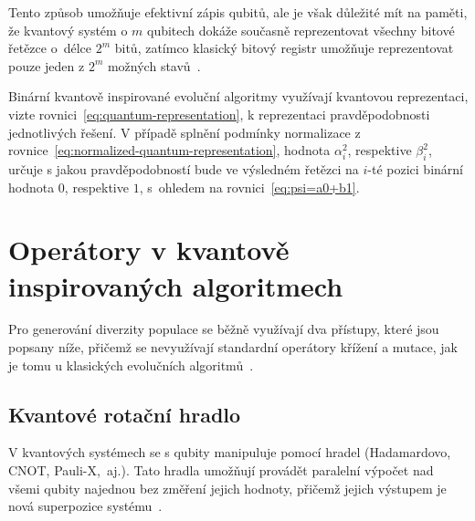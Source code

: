 Tento způsob umožňuje efektivní zápis qubitů, ale je však důležité mít na paměti, že kvantový systém o $m$ qubitech dokáže současně reprezentovat všechny bitové řetězce o~délce $2^m$ bitů, zatímco klasický bitový registr umožňuje reprezentovat pouze jeden z $2^m$ možných stavů~\cite{NaturalComputing}. 

Binární kvantově inspirované evoluční algoritmy využívají kvantovou reprezentaci, vizte rovnici~\ref{eq:quantum-representation}, k reprezentaci pravděpodobnosti jednotlivých řešení. 
V případě splnění podmínky normalizace z rovnice~\ref{eq:normalized-quantum-representation}, hodnota $\alpha^2_i$, respektive $\beta^2_i$, určuje s jakou pravděpodobností bude ve výsledném řetězci na $i$-té pozici binární hodnota $0$, respektive $1$, s~ohledem na rovnici~\ref{eq:psi=a0+b1}.

\section{Operátory v kvantově inspirovaných algoritmech}
Pro generování diverzity populace se běžně využívají dva přístupy, které jsou popsany níže, přičemž se nevyužívají standardní operátory křížení a mutace, jak je tomu u klasických evolučních algoritmů~\cite{NaturalComputing}.

\subsection{Kvantové rotační hradlo}\label{subsec:quantum-gates}
V kvantových systémech se s qubity manipuluje pomocí hradel (Hadamardovo, CNOT, Pauli-X,~aj.). 
Tato hradla umožňují provádět paralelní výpočet nad všemi qubity najednou bez změření jejich hodnoty, přičemž jejich výstupem je nová superpozice systému~\cite{NaturalComputing,QuantumComputing-Curious,QuantumComputing-QuantumInformation}. 

